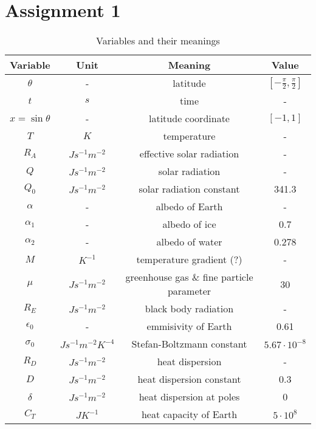 \section{Assignment 1}

\begin{table}[H]
    \centering
    \begin{tabular}{|c|c|c|c|}
        \hline
        Variable & Unit &  Meaning & Value\\
        \hline
        $\theta$ & - & latitude & $[-\frac{\pi}{2}, \frac{\pi}{2}]$\\
        $t $ & $s$ & time & -\\
        $x = \sin \theta$ & -  & latitude coordinate & $[-1, 1]$\\
        $T $ & $K$ & temperature & -\\
        $R_A $ & $J s^{-1} m^{-2}$ & effective solar radiation & - \\
        $Q $ & $J s^{-1} m^{-2}$ & solar radiation & -\\
        $Q_0 $ & $J s^{-1} m^{-2}$ & solar radiation constant & 341.3\\
        $\alpha$ & - & albedo of Earth & -\\
        $\alpha_1$ & - & albedo of ice & 0.7\\
        $\alpha_2$ & - & albedo of water & 0.278\\
        $M$ & $K^{-1}$ & temperature gradient (?) & -\\
        $\mu $ & $J s^{-1} m^{-2}$ & greenhouse gas \& fine particle parameter & 30\\
        $R_E $ & $J s^{-1} m^{-2}$ & black body radiation & -\\
        $\epsilon_0$ & - & emmisivity of Earth & 0.61\\
        $\sigma_0 $ & $J s^{-1} m^{-2} K^{-4}$ & Stefan-Boltzmann constant & $5.67 \cdot 10^{-8}$\\
        $R_D $ & $J s^{-1} m^{-2}$ & heat dispersion & -\\
        $D $ & $J s^{-1} m^{-2}$ & heat dispersion constant & 0.3\\
        $\delta $ & $J s^{-1} m^{-2}$ & heat dispersion at poles & 0\\
        $C_T $ & $J K^{-1}$  & heat capacity of Earth & $5 \cdot 10^{8}$\\
        \hline
    \end{tabular}
    \caption{Variables and their meanings}
    \label{tab:vars}
\end{table}

